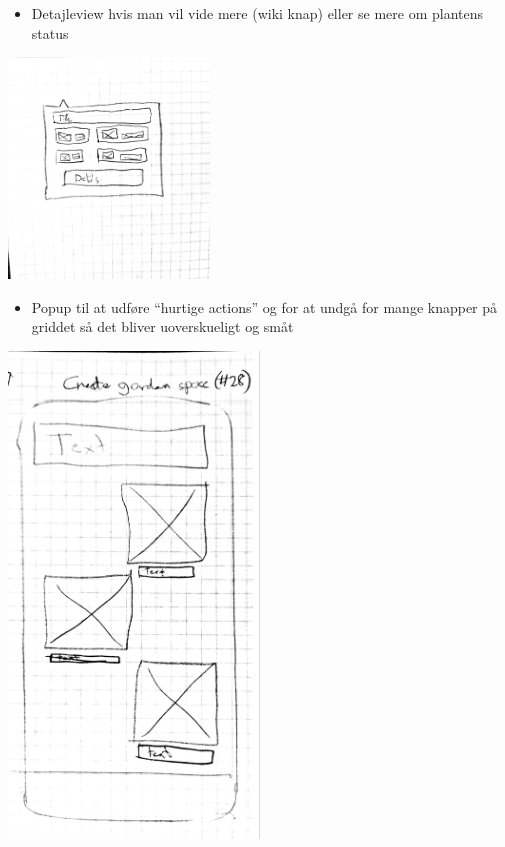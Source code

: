 \begin{itemize}
    \item Detajleview hvis man vil vide mere (wiki knap) eller se mere om plantens status
\end{itemize}

\includegraphics[width=0.4\textwidth]{img/s1-6.jpg}\\

\begin{itemize}
    \item Popup til at udføre ``hurtige actions'' og for at undgå for mange knapper på griddet så det bliver uoverskueligt og småt
\end{itemize}

\includegraphics[width=0.5\textwidth]{img/s1-10.jpg}\\

